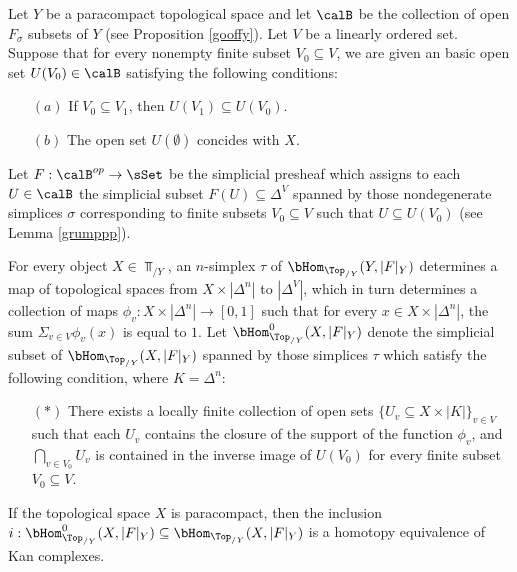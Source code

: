 \begin{lemma}\label{prechange}
Let $Y$ be a paracompact topological space and let $\calB$ be the collection of open $F_{\sigma}$ subsets of $Y$ (see Proposition \ref{gooffy}). Let $V$ be a linearly ordered set. Suppose that for
every nonempty finite subset $V_0 \subseteq V$, we are given an basic open set
$U(V_0) \in \calB$ satisfying the following conditions:
\begin{itemize}
\item[$(a)$] If $V_0 \subseteq V_1$, then $U(V_1) \subseteq U(V_0)$.
\item[$(b)$] The open set $U( \emptyset)$ concides with $X$.
\end{itemize}
Let $F: \calB^{op} \rightarrow \sSet$ be the simplicial presheaf which assigns to
each $U \in \calB$ the simplicial subset $F(U) \subseteq \Delta^{V}$ spanned by those nondegenerate simplices $\sigma$ corresponding to finite subsets $V_0 \subseteq V$ such that $U \subseteq U(V_0)$
(see Lemma \ref{grumppp}). 

For every object $X \in \Top_{/Y}$, an $n$-simplex $\tau$ of 
$\bHom_{ \Top_{/Y}}(Y, |F|_Y)$ determines a map of topological spaces from
$X \times | \Delta^n |$ to $| \Delta^{V} |$, which in turn determines a collection of maps
$\phi_{v}: X \times | \Delta^n | \rightarrow [0,1]$ such that for every $x \in X \times | \Delta^n |$, the 
sum $\Sigma_{v \in V} \phi_v(x)$ is equal to $1$. Let $\bHom^{0}_{\Top_{/Y}}(X, |F|_Y)$ denote the simplicial subset of $\bHom_{ \Top_{/Y}}(X, |F|_Y)$ spanned by those simplices $\tau$ which satisfy the following condition, where $K = \Delta^n$: 
\begin{itemize}
\item[$(\ast)$] There exists a locally finite collection of open sets $\{ U_{v} \subseteq X \times |K| \}_{v \in V}$
such that each $U_{v}$ contains the closure of the support of the function $\phi_{v}$, and
$\bigcap_{v \in V_0} U_{v}$ is contained in the inverse image of $U(V_0)$ for every finite subset $V_0 \subseteq V$.
\end{itemize}
If the topological space $X$ is paracompact, then the inclusion
$i: \bHom^{0}_{ \Top_{/Y}}( X, |F|_Y) \subseteq \bHom_{ \Top_{/Y}}( X, |F|_Y)$ is a homotopy equivalence of Kan complexes.
\end{lemma}

